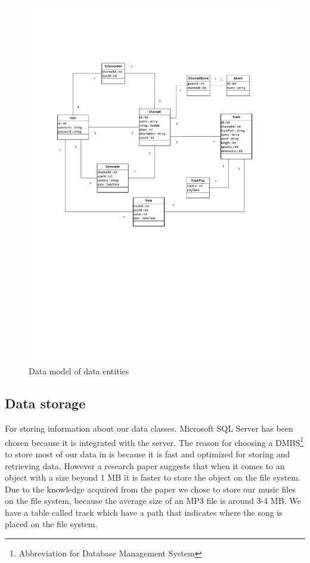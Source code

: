 \documentclass[a4paper,11pt,report]{article}
\begin{document}
\begin{figure}[H]
  \centering
\includegraphics[width=320pt,keepaspectratio=true]{./ermodel.pdf}
\caption{Data model of data entities}
\end{figure}
\subsection{Data storage}
For storing information about our data classes. Microsoft SQL Server has been chosen because it is integrated with the server. The reason for choosing a DMBS\footnote[1]{Abbreviation for Database Management System} to store most of our data in is because it is fast and optimized for storing and retrieving data. However a research paper\cite{Russel} suggests that when it comes to an object with a size beyond 1 MB it is faster to store the object on the file system. Due to the knowledge acquired from the paper we chose to store our music files on the file system, because the average size of an MP3 file is around 3-4 MB. We have a table called track which have a path that indicates where the song is placed on the file system.
\end{document}
